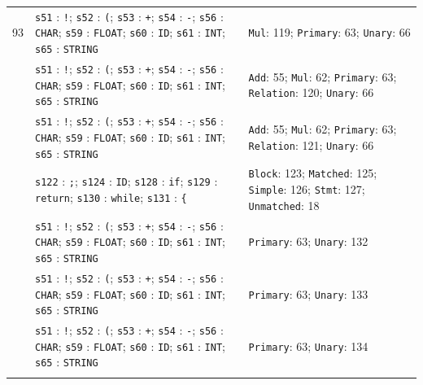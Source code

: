 {\begin{longtable}{@{}r p{10.1cm}p{4.4cm}@{}}
93 & \texttt{s51} : \texttt{!}; \texttt{s52} : \texttt{(}; \texttt{s53} : \texttt{+}; \texttt{s54} : \texttt{-}; \texttt{s56} : \texttt{CHAR}; \texttt{s59} : \texttt{FLOAT}; \texttt{s60} : \texttt{ID}; \texttt{s61} : \texttt{INT}; \texttt{s65} : \texttt{STRING} & \texttt{Mul}: 119; \texttt{Primary}: 63; \texttt{Unary}: 66\\\addlinespace[3pt]
94 & \texttt{s51} : \texttt{!}; \texttt{s52} : \texttt{(}; \texttt{s53} : \texttt{+}; \texttt{s54} : \texttt{-}; \texttt{s56} : \texttt{CHAR}; \texttt{s59} : \texttt{FLOAT}; \texttt{s60} : \texttt{ID}; \texttt{s61} : \texttt{INT}; \texttt{s65} : \texttt{STRING} & \texttt{Add}: 55; \texttt{Mul}: 62; \texttt{Primary}: 63; \texttt{Relation}: 120; \texttt{Unary}: 66\\\addlinespace[3pt]
95 & \texttt{s51} : \texttt{!}; \texttt{s52} : \texttt{(}; \texttt{s53} : \texttt{+}; \texttt{s54} : \texttt{-}; \texttt{s56} : \texttt{CHAR}; \texttt{s59} : \texttt{FLOAT}; \texttt{s60} : \texttt{ID}; \texttt{s61} : \texttt{INT}; \texttt{s65} : \texttt{STRING} & \texttt{Add}: 55; \texttt{Mul}: 62; \texttt{Primary}: 63; \texttt{Relation}: 121; \texttt{Unary}: 66\\\addlinespace[3pt]
96 & \texttt{s122} : \texttt{;}; \texttt{s124} : \texttt{ID}; \texttt{s128} : \texttt{if}; \texttt{s129} : \texttt{return}; \texttt{s130} : \texttt{while}; \texttt{s131} : \texttt{\{} & \texttt{Block}: 123; \texttt{Matched}: 125; \texttt{Simple}: 126; \texttt{Stmt}: 127; \texttt{Unmatched}: 18\\\addlinespace[3pt]
97 & \texttt{s51} : \texttt{!}; \texttt{s52} : \texttt{(}; \texttt{s53} : \texttt{+}; \texttt{s54} : \texttt{-}; \texttt{s56} : \texttt{CHAR}; \texttt{s59} : \texttt{FLOAT}; \texttt{s60} : \texttt{ID}; \texttt{s61} : \texttt{INT}; \texttt{s65} : \texttt{STRING} & \texttt{Primary}: 63; \texttt{Unary}: 132\\\addlinespace[3pt]
98 & \texttt{s51} : \texttt{!}; \texttt{s52} : \texttt{(}; \texttt{s53} : \texttt{+}; \texttt{s54} : \texttt{-}; \texttt{s56} : \texttt{CHAR}; \texttt{s59} : \texttt{FLOAT}; \texttt{s60} : \texttt{ID}; \texttt{s61} : \texttt{INT}; \texttt{s65} : \texttt{STRING} & \texttt{Primary}: 63; \texttt{Unary}: 133\\\addlinespace[3pt]
99 & \texttt{s51} : \texttt{!}; \texttt{s52} : \texttt{(}; \texttt{s53} : \texttt{+}; \texttt{s54} : \texttt{-}; \texttt{s56} : \texttt{CHAR}; \texttt{s59} : \texttt{FLOAT}; \texttt{s60} : \texttt{ID}; \texttt{s61} : \texttt{INT}; \texttt{s65} : \texttt{STRING} & \texttt{Primary}: 63; \texttt{Unary}: 134\\\addlinespace[3pt]

\end{longtable}}
